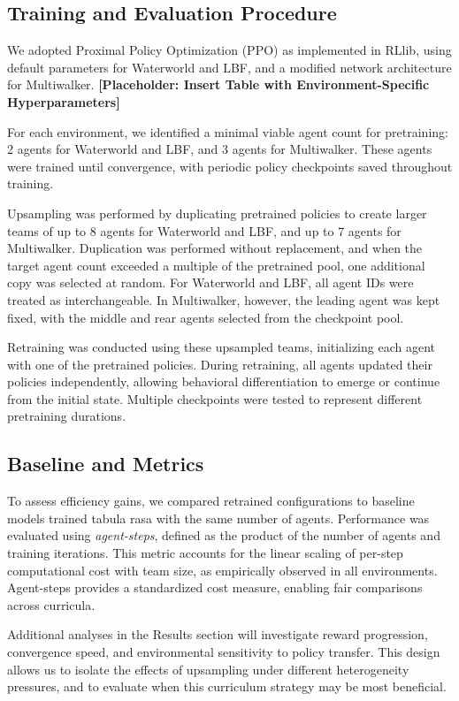 \documentclass{article}
\begin{document}
\subsection{Training and Evaluation Procedure}

We adopted Proximal Policy Optimization (PPO) as implemented in RLlib, using default parameters for Waterworld and LBF, and a modified network architecture for Multiwalker. \textbf{[Placeholder: Insert Table with Environment-Specific Hyperparameters]}

For each environment, we identified a minimal viable agent count for pretraining: 2 agents for Waterworld and LBF, and 3 agents for Multiwalker. These agents were trained until convergence, with periodic policy checkpoints saved throughout training.

Upsampling was performed by duplicating pretrained policies to create larger teams of up to 8 agents for Waterworld and LBF, and up to 7 agents for Multiwalker. Duplication was performed without replacement, and when the target agent count exceeded a multiple of the pretrained pool, one additional copy was selected at random. For Waterworld and LBF, all agent IDs were treated as interchangeable. In Multiwalker, however, the leading agent was kept fixed, with the middle and rear agents selected from the checkpoint pool.

Retraining was conducted using these upsampled teams, initializing each agent with one of the pretrained policies. During retraining, all agents updated their policies independently, allowing behavioral differentiation to emerge or continue from the initial state. Multiple checkpoints were tested to represent different pretraining durations.

\subsection{Baseline and Metrics}

To assess efficiency gains, we compared retrained configurations to baseline models trained tabula rasa with the same number of agents. Performance was evaluated using \textit{agent-steps}, defined as the product of the number of agents and training iterations. This metric accounts for the linear scaling of per-step computational cost with team size, as empirically observed in all environments. Agent-steps provides a standardized cost measure, enabling fair comparisons across curricula.

Additional analyses in the Results section will investigate reward progression, convergence speed, and environmental sensitivity to policy transfer. This design allows us to isolate the effects of upsampling under different heterogeneity pressures, and to evaluate when this curriculum strategy may be most beneficial.
\end{document}
